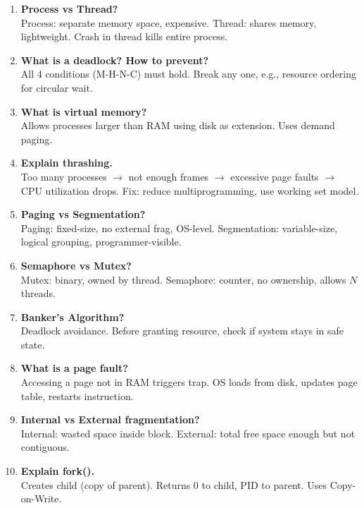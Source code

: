 \documentclass[12pt,a4paper]{article}
\begin{document}
\begin{enumerate}[leftmargin=*, label=\textbf{Q\arabic*.}]

\item \textbf{Process vs Thread?} \\
Process: separate memory space, expensive. Thread: shares memory, lightweight. Crash in thread kills entire process.

\item \textbf{What is a deadlock? How to prevent?} \\
All 4 conditions (M-H-N-C) must hold. Break any one, e.g., resource ordering for circular wait.

\item \textbf{What is virtual memory?} \\
Allows processes larger than RAM using disk as extension. Uses demand paging.

\item \textbf{Explain thrashing.} \\
Too many processes $\rightarrow$ not enough frames $\rightarrow$ excessive page faults $\rightarrow$ CPU utilization drops. Fix: reduce multiprogramming, use working set model.

\item \textbf{Paging vs Segmentation?} \\
Paging: fixed-size, no external frag, OS-level. Segmentation: variable-size, logical grouping, programmer-visible.

\item \textbf{Semaphore vs Mutex?} \\
Mutex: binary, owned by thread. Semaphore: counter, no ownership, allows $N$ threads.

\item \textbf{Banker's Algorithm?} \\
Deadlock avoidance. Before granting resource, check if system stays in safe state.

\item \textbf{What is a page fault?} \\
Accessing a page not in RAM triggers trap. OS loads from disk, updates page table, restarts instruction.

\item \textbf{Internal vs External fragmentation?} \\
Internal: wasted space inside block. External: total free space enough but not contiguous.

\item \textbf{Explain fork().} \\
Creates child (copy of parent). Returns 0 to child, PID to parent. Uses Copy-on-Write.


\end{enumerate}
\end{document}
